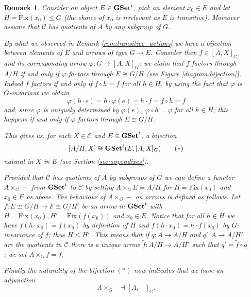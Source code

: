 \documentclass[italian, 12pt, reqno]{article}
\theoremstyle{myteo}
\newtheorem{remark}[theorem]{Remark}
\numberwithin{equation}{section}
\newcommand{\cat}[1]{\mathscr{#1}}
\newcommand{\tgset}{\text{\textbf{GSet}}^t}
\newcommand{\fix}[1]{\text{Fix}(#1)}
\newcommand{\homs}[2]{[#1, #2]}
\newcommand{\fun}[3]{#1\colon#2\to #3}
\begin{document}
\begin{remark}
  \label{rem:adjoints}
  Consider an object \(E\in\tgset\), pick an element \(x_0\in E\) and let \(H = \fix{x_0}\leq G\) (the choice of \(x_0\) is irrelevant as \(E\) is transitive).
  Moreover assume that \(\cat{C}\) has quotients of \(A\) by any subgroup of \(G\).

  By what we observed in Remark \ref{rem:transitive_actions} we have a bijection between elements of \(E\) and arrows of type \(G\to E\).
  Consider then \(f\in\homs{A}{X}_G\) and its corresponding arrow \(\fun{\varphi}{G}{\homs{A}{X}_G}\); we claim that \(f\) factors through \(A/H\) if and only if \(\varphi\) factors through \(E \cong G/H\) (see Figure \ref{diagram:bijection}).
  Indeed \(f\) factors if and only if \(f\circ h = f\) for all \(h\in H\), by using the fact that \(\varphi\) is \(G\)-invariant we obtain
  \[\varphi(h\cdot e) = h\cdot\varphi(e) = h\cdot f = f\circ h = f\]
  and, since \(\varphi\) is uniquely determined by \(\varphi(e)\),  \(\varphi\circ h =\varphi\) for all \(h\in H\); this happens if and only if \(\varphi\) factors through \(E\cong G/H\).

  This gives us, for each \(X\in\cat{C}\) and \(E\in\tgset\), a bijection
  \[[A/H, X] \cong \tgset(E, [A, X]_G)\tag{\(*\)}\]
  natural in \(X\) in \(E\) (see Section \ref{sec:appendixes}).

	Provided that \(\cat{C}\) has quotients of \(A\) by subgroups of \(G\) we can define a functor \(A\times_G -\) from \(\tgset\) to \(\cat{C}\) by setting \(A\times_G E = A/H\) for \(H=\text{Fix}(x_0)\) and \(x_0\in E\) as above.
	The behaviour of \(A\times_G-\) on arrows is defined as follows.
	Let \(\fun{f}{E\cong G/H}{F\cong G/H'}\) be an arrow in \(\tgset\) with \(H=\text{Fix}(x_0), H'=\text{Fix}(f(x_0))\) and \(x_0\in E\).
	Notice that for all \(h\in H\) we have \(f(h\cdot x_0) = f(x_0)\) by definition of \(H\) and \(f(h\cdot x_0) = h\cdot f(x_0)\) by \(G\)-invariance of \(f\); thus \(H\leq H'\).
	This means that if \(\fun{q}{A}{A/H}\) and \(\fun{q'}{A}{A/H'}\) are the quotients in \(\cat{C}\) there is a unique arrow \(\fun{\tilde{f}}{A/H}{A/H'}\) such that \(q' = \tilde{f}\circ q\); we set \(A\times_G f = \tilde{f}\).
	
	Finally the naturality of the bijection \((*)\) now indicates that we have an adjunction
  \[A\times_G - \dashv \homs{A}{-}_G.\] 
\end{remark}
\end{document}
